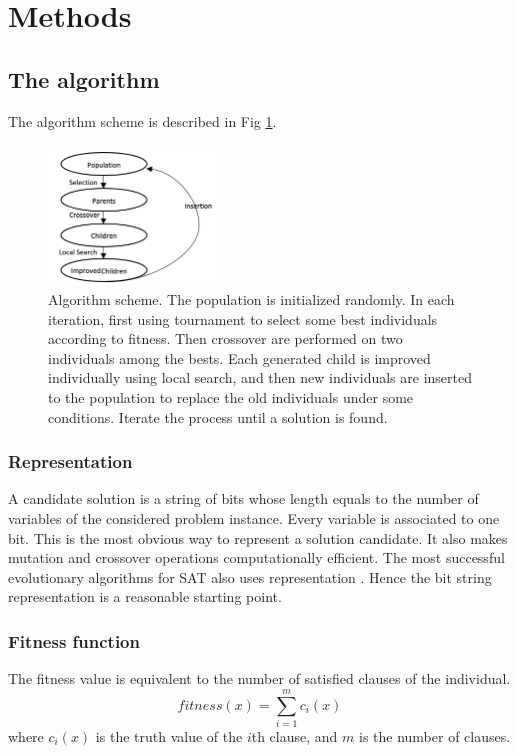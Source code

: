 \section{Methods}
\subsection{The algorithm}
The algorithm scheme is described in Fig \ref{fig:1.png}.
\begin{figure}[H]
	\centering
	\includegraphics[width=0.4\textwidth]{1.png}
	\caption{Algorithm scheme. The population is initialized randomly.  In each
		iteration, first using tournament to select some best individuals according to fitness.
		Then crossover are performed on two individuals among the bests. Each
		generated child is improved individually using local search, and then new individuals are inserted to the population to replace the old
		individuals under some conditions. Iterate the process until a solution is
		found.						}
	\label{fig:1.png}
\end{figure}

\subsubsection{Representation}
A candidate solution is a string of bits whose length equals to the number of
variables of the considered problem instance. Every variable is associated to
one bit. This is the most obvious way to represent a solution candidate. It
also makes mutation and crossover operations computationally efficient. The
most successful evolutionary algorithms for SAT also uses representation
\parencite{gottlieb_marchiori_rossi_2002}. Hence the bit string representation is a reasonable
starting point.

\subsubsection{Fitness function}
The fitness value is equivalent to the number of satisfied clauses of the
individual.
\begin{equation*}
	\mathit{fitness}(x) = \sum_{i=1}^m c_i(x)
\end{equation*}
where $c_i(x)$ is the truth value of the $i$th
clause, and $m$ is the number of clauses.

